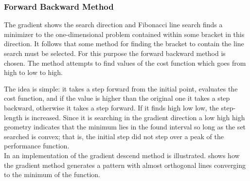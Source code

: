 \subsubsection{Forward Backward Method}
The gradient shows the search direction and Fibonacci line search finds a minimizer to the one-dimensional problem contained within some bracket in this direction. It follows that some method for finding the bracket to contain the line search must be selected. For this purpose the forward backward method is chosen. The method attempts to find values of the cost function which goes from high to low to high.

The idea is simple: it takes a step forward from the initial point, evaluates the cost function, and if the value is higher than the original one it takes a step backward, otherwise it takes a step forward. If it finds high low low, the step-length is increased. Since it is searching in the gradient direction a low high high geometry indicates that the minimum lies in the found interval so long as the set searched is convex; that is, the initial step did not step over a peak of the performance function.\\
In  an implementation of the gradient descend method is illustrated.  shows how the gradient method generates a pattern with almost orthogonal lines converging to the minimum of the function.

